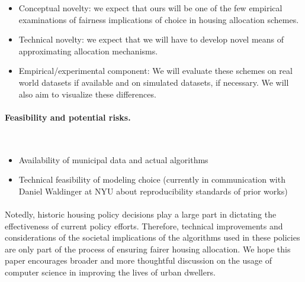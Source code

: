 \documentclass[11pt]{article}
\begin{document}
\begin{itemize} 

\item Conceptual novelty: we expect that ours will be one of the few empirical examinations of fairness implications of choice in housing allocation schemes.

\item Technical novelty: we expect that we will have to develop novel means of approximating allocation mechanisms.


\item Empirical/experimental component: We will evaluate these schemes on real world datasets if available and on simulated datasets, if necessary. We will also aim to visualize these differences. 

\end{itemize}


\paragraph{Feasibility and potential risks.} \\

\begin{itemize}
\item Availability of municipal data and actual algorithms
\item Technical feasibility of modeling choice (currently in communication with Daniel Waldinger at NYU about reproducibility standards of prior works)
\end{itemize}

\paragraph{}
Notedly, historic housing policy decisions play a large part in dictating the effectiveness of current policy efforts. Therefore, technical improvements and considerations of the societal implications of the algorithms used in these policies are only part of the process of ensuring fairer housing allocation. We hope this paper encourages broader and more thoughtful discussion on the usage of computer science in improving the lives of urban dwellers. \\
\end{document}
